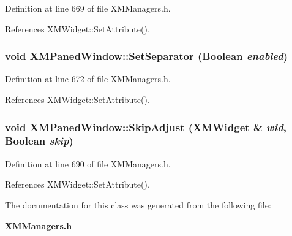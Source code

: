 Definition at line 669 of file XMManagers.h.

References XMWidget::Set\-Attribute().
\subsubsection{\setlength{\rightskip}{0pt plus 5cm}void XMPaned\-Window::Set\-Separator (Boolean {\em enabled})\hspace{0.3cm}{\tt  [inline]}}\label{classXMPanedWindow_a7}




Definition at line 672 of file XMManagers.h.

References XMWidget::Set\-Attribute().
\subsubsection{\setlength{\rightskip}{0pt plus 5cm}void XMPaned\-Window::Skip\-Adjust ({\bf XMWidget} \& {\em wid}, Boolean {\em skip})\hspace{0.3cm}{\tt  [inline]}}\label{classXMPanedWindow_a12}




Definition at line 690 of file XMManagers.h.

References XMWidget::Set\-Attribute().

The documentation for this class was generated from the following file:\begin{CompactItemize}
\item 
{\bf XMManagers.h}\end{CompactItemize}
